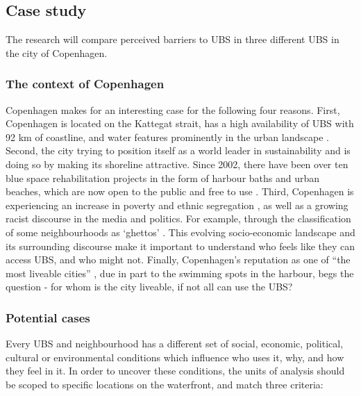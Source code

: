 \documentclass{article}
\begin{document}
\subsection{Case study}

The research will compare perceived barriers to UBS in three different UBS in the city of Copenhagen.

\subsubsection{The context of Copenhagen}

Copenhagen makes for an interesting case for the following four reasons. First, Copenhagen is located on the Kattegat strait, has a high availability of UBS with 92 km of coastline, and water features prominently in the urban landscape \parencite{comertler2017greens}. Second, the city trying to position itself as a world leader in sustainability and is doing so by making its shoreline attractive. Since 2002, there have been over ten blue space rehabilitation projects in the form of harbour baths and urban beaches, which are now open to the public and free to use \parencite{visitcopenhagen_baths}. Third, Copenhagen is experiencing an increase in poverty and ethnic segregation \parencite{moller2015socioeconomic}, as well as a growing racist discourse in the media and politics. For example, through the classification of some neighbourhoods as ‘ghettos’ \parencite{simonsen2008practice}. This evolving socio-economic landscape and its surrounding discourse make it important to understand who feels like they can access UBS, and who might not. Finally, Copenhagen’s reputation as one of ``the most liveable cities'' \parencite{visitdenmark_2021}, due in part to the swimming spots in the harbour, begs the question - for whom is the city liveable, if not all can use the UBS?


\subsubsection{Potential cases}

Every UBS and neighbourhood has a different set of social, economic, political, cultural or environmental conditions which influence who uses it, why, and how they feel in it. In order to uncover these conditions, the units of analysis should be scoped to specific locations on the waterfront, and match three criteria:
\end{document}
